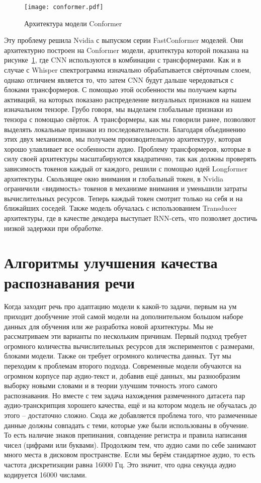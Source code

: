 \begin{figure}[!t]
  \centering
  \texttt{[image: conformer.pdf]}
  \caption{Архитектура модели Conformer}
  \label{fig:conformer}
\end{figure}

Эту проблему решила Nvidia с выпуском серии FastConformer моделей\cite{rekesh2023fast}. 
Они архитектурно построен на Conformer модели\cite{gulati2020conformers}, архитектура которой показана на рисунке~\ref{fig:conformer}, где CNN используются в комбинации с трансформерами.
Как и в случае с Whisper спектрограмма изначально обрабатывается свёрточным слоем, однако отличием является то, что затем CNN будут дальше чередоваться с блоками трансформеров.
С помощью этой особенности мы получаем карты активаций, на которых показано распределение визуальных признаков на нашем изначальном тензоре.
Грубо говоря, мы выделаем глобальные признаки из тензора с помощью свёрток.
А трансформеры, как мы говорили ранее, позволяют выделять локальные признаки из последовательности.
Благодаря объединению этих двух механизмов, мы получаем производительную архитектуру, которая хорошо улавливает все особенности аудио.
Проблему трансформеров, которые в силу своей архитектуры масштабируются квадратично, так как должны проверять зависимость токенов каждый от каждого, решили с помощью идей Longformer\cite{beltagy2020longformer} архитектуры.
Скользящее окно внимания и глобальный токен, в Nvidia ограничили «видимость» токенов в механизме внимания и уменьшили затраты вычислительных ресурсов.
Теперь каждый токен смотрит только на себя и на ближайших соседей.
Также модель обучалась с использованием Transducer архитектуры, где в качестве декодера выступает RNN-сеть, что позволяет достичь низкой задержки при обработке.


\section{Алгоритмы улучшения качества распознавания речи}
Когда заходит речь про адаптацию модели к какой-то задачи, первым на ум приходит дообучение этой самой модели на дополнительном большом наборе данных для обучения или же разработка новой архитектуры.
Мы не рассматриваем эти варианты по нескольким причинам.
Первый подход требует огромного количества вычислительных ресурсов для экспериментов с размерами, блоками модели.
Также он требует огромного количества данных.
Тут мы переходим к проблемам второго подхода.
Современные модели обучаются на огромном корпусе пар аудио-текст и, добавив ещё данных, мы разнообразим выборку новыми словами и в теории улучшим точность этого самого распознавания.
Но вместе с тем задача нахождения размеченного датасета пар аудио-транскрипция хорошего качества, ещё и на котором модель не обучалась до этого -- достаточно сложно.
Сюда же добавляется проблема того, что размеченные данные должны совпадать с теми, которые уже были использованы в обучение.
То есть наличие знаков препинания, совпадение регистра и правила написания чисел (цифрами или буквами).
Продолжим тем, что аудио сами по себе занимают много места в дисковом пространстве.
Если мы берём стандартное аудио, то есть частота дискретизации равна 16000 Гц.
Это значит, что одна секунда аудио кодируется 16000 числами.

